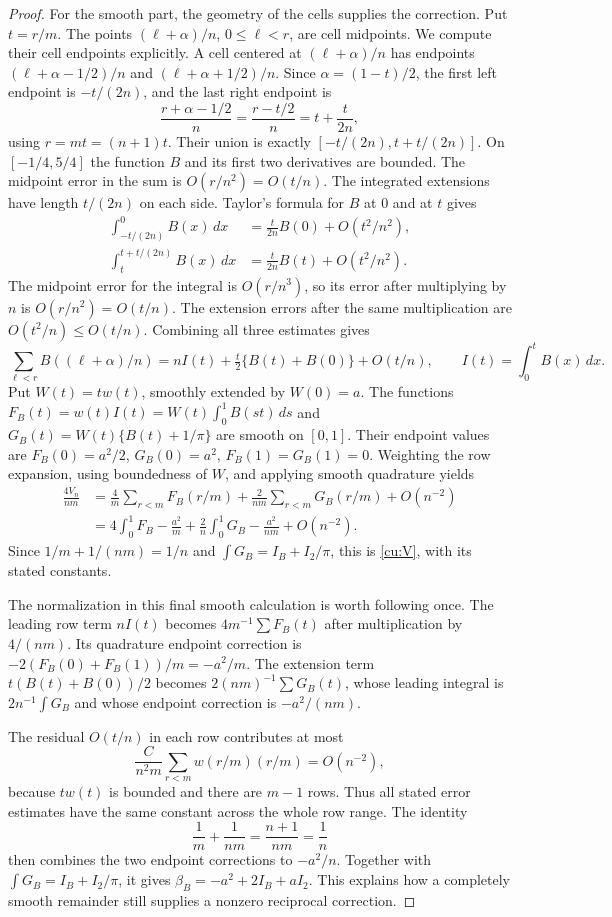 \begin{proof}
For the smooth part, the geometry of the cells supplies the correction.
Put $t=r/m$. The points $(\ell+\alpha)/n$, $0\leq\ell<r$,
are cell midpoints. We compute their cell endpoints explicitly. A cell centered at
$(\ell+\alpha)/n$ has endpoints
$(\ell+\alpha-1/2)/n$ and $(\ell+\alpha+1/2)/n$.
Since $\alpha=(1-t)/2$, the first left endpoint is $-t/(2n)$,
and the last right endpoint is
\[
 \frac{r+\alpha-1/2}{n}
 =\frac{r-t/2}{n}=t+\frac{t}{2n},
\]
using $r=mt=(n+1)t$. Their union is exactly
$[-t/(2n),t+t/(2n)]$.
On $[-1/4,5/4]$ the function $B$ and its first two derivatives are bounded.
The midpoint error in the sum is $O(r/n^2)=O(t/n)$.
The integrated extensions have length $t/(2n)$ on each side.
Taylor's formula for $B$ at $0$ and at $t$ gives
\[
 \begin{aligned}
 \int_{-t/(2n)}^0B(x)\,dx
    &=\frac{t}{2n}B(0)+O(t^2/n^2),\\
 \int_t^{t+t/(2n)}B(x)\,dx
    &=\frac{t}{2n}B(t)+O(t^2/n^2).
 \end{aligned}
\]
The midpoint error for the integral is $O(r/n^3)$, so its
error after multiplying by $n$ is $O(r/n^2)=O(t/n)$.
The extension errors after the same multiplication are
$O(t^2/n)\leq O(t/n)$. Combining all three estimates gives
\[
 \sum_{\ell<r}B((\ell+\alpha)/n)
   =nI(t)+\tfrac t2\{B(t)+B(0)\}+O(t/n),\qquad I(t)=\int_0^tB(x)\,dx.
\]
Put $W(t)=tw(t)$, smoothly extended by $W(0)=a$.
The functions $F_B(t)=w(t)I(t)=W(t)\int_0^1B(st)\,ds$ and
$G_B(t)=W(t)\{B(t)+1/\pi\}$ are smooth on $[0,1]$.
Their endpoint values are $F_B(0)=a^2/2$, $G_B(0)=a^2$,
$F_B(1)=G_B(1)=0$. Weighting the row expansion, using boundedness
of $W$, and applying smooth quadrature yields
\[
 \begin{aligned}
 \frac{4V_n}{nm}
 &=\frac4m\sum_{r<m}F_B(r/m)+\frac2{nm}\sum_{r<m}G_B(r/m)+O(n^{-2})\\
 &=4\int_0^1F_B-\frac{a^2}{m}
       +\frac2n\int_0^1G_B-\frac{a^2}{nm}+O(n^{-2}).
 \end{aligned}
\]
Since $1/m+1/(nm)=1/n$ and $\int G_B=I_B+I_2/\pi$, this is
\eqref{cu:V}, with its stated constants.

The normalization in this final smooth calculation is worth
following once. The leading row term $nI(t)$ becomes
$4m^{-1}\sum F_B(t)$ after multiplication by $4/(nm)$.
Its quadrature endpoint correction is
$-2(F_B(0)+F_B(1))/m=-a^2/m$.
The extension term $t(B(t)+B(0))/2$ becomes
$2(nm)^{-1}\sum G_B(t)$, whose leading integral is
$2n^{-1}\int G_B$ and whose endpoint correction is
$-a^2/(nm)$.

The residual $O(t/n)$ in each row contributes at most
\[
 \frac{C}{n^2m}\sum_{r<m}w(r/m)(r/m)=O(n^{-2}),
\]
because $tw(t)$ is bounded and there are $m-1$ rows.
Thus all stated error estimates have the same constant across the
whole row range. The identity
\[
 \frac1m+\frac1{nm}=\frac{n+1}{nm}=\frac1n
\]
then combines the two endpoint corrections to $-a^2/n$.
Together with $\int G_B=I_B+I_2/\pi$, it gives
$\beta_B=-a^2+2I_B+aI_2$. This explains how a completely
smooth remainder still supplies a nonzero reciprocal correction.
\end{proof}

